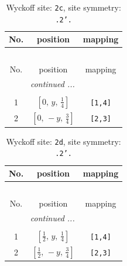 \documentclass[fleqn,8pt]{jsarticle}
\begin{document}
\begin{longtable}{ccc}
\caption{Wyckoff site: {\tt 2c}, site symmetry: {\tt .2'.}}
 \\
 \hline \hline
No. & position & mapping \\ \hline \endfirsthead

\multicolumn{2}{l}{\tablename\ \thetable{}} \\
 \hline \hline
No. & position & mapping \\ \hline \endhead

 \hline \hline
\multicolumn{2}{r}{\footnotesize\it continued ...} \\ \endfoot

 \hline \hline
\multicolumn{2}{r}{} \\ \endlastfoot

1 & $\left[ 0,\, y,\, \frac{1}{4} \right]$ & {\tt [1,4]} \\ \hline
2 & $\left[ 0,\, - y,\, \frac{3}{4} \right]$ & {\tt [2,3]} \\
\end{longtable}
\renewcommand{\arraystretch}{1.2}
\begin{longtable}{ccc}
\caption{Wyckoff site: {\tt 2d}, site symmetry: {\tt .2'.}}
 \\
 \hline \hline
No. & position & mapping \\ \hline \endfirsthead

\multicolumn{2}{l}{\tablename\ \thetable{}} \\
 \hline \hline
No. & position & mapping \\ \hline \endhead

 \hline \hline
\multicolumn{2}{r}{\footnotesize\it continued ...} \\ \endfoot

 \hline \hline
\multicolumn{2}{r}{} \\ \endlastfoot

1 & $\left[ \frac{1}{2},\, y,\, \frac{1}{4} \right]$ & {\tt [1,4]} \\ \hline
2 & $\left[ \frac{1}{2},\, - y,\, \frac{3}{4} \right]$ & {\tt [2,3]} \\
\end{longtable}
\renewcommand{\arraystretch}{1.2}
\end{document}
